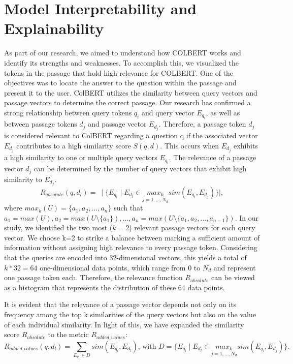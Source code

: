 \documentclass{article}
\begin{document}
\section{Model Interpretability and Explainability}
As part of our research, we aimed to understand how COLBERT works and identify its strengths and weaknesses.
To accomplish this, we visualized the tokens in the passage that hold high relevance for COLBERT. One of the objectives
was to locate the answer to the question within the passage and present it to the user.
ColBERT utilizes the similarity between query vectors and passage vectors to determine the correct passage.
Our research has confirmed a strong relationship between query tokens $q_i$ and query vector $E_{q_i}$, as well as between
passage tokens $d_j$ and passage vector $E_{d_j}$.
Therefore, a passage token $d_j$ is considered relevant to ColBERT regarding
a question q if the associated vector $E_{d_j}$ contributes to a high similarity score $S(q, d)$.
This occurs when $E_{d_j}$ exhibits a high similarity to one or multiple query vectors $E_{q_i}$.
The relevance of a passage vector $d_j$ can be determined by the number of query vectors that exhibit high similarity
to $E_{d_j}$.
$$
    R_{absolute}(q, d_l) = \:\mid \{E_{q_i} \mid E_{d_l} \in \underset{j = 1, \dots, N_d}{max_k} sim(E_{q_i}, E_{d_j})\} \mid,
$$
where $max_k(U) = \{a_1, a_2, \dots, a_n\}$ such that $a_1 = max(U), a_2 = max(U \setminus \{a_1\}), \dots, a_n = max(U \setminus \{a_1, a_2, \dots, a_{n-1}\})$.
In our study, we identified the two most ($k=2$) relevant passage vectors for each query vector.
We choose k=2 to strike a balance between marking a sufficient amount of information without assigning high relevance to every passage token. 
Considering that the queries are encoded into $32$-dimensional vectors, 
this yields a total of $k*32=64$ one-dimensional data points, which range from $0$ to $N_d$ and represent one passage token each.
Therefore, the relevance function $R_{absolute}$ can be viewed as a histogram that represents the distribution of these $64$ data points.

It is evident that the relevance of a passage vector depends not only on its frequency among the top k similarities of the query vectors
 but also on the value of each individual similarity.
In light of this, we have expanded the similarity score $R_{absolute}$ to the metric $R_{added\_values}$:
$$
	R_{added\_values}(q, d_l) = \sum_{E_{q_i} \in D} sim(E_{q_i}, E_{d_l}) \text{, with } D= \{E_{q_i} \mid E_{d_l} \in \underset{j = 1, \dots, N_d}{max_k} sim(E_{q_i}, E_{d_j})\}.
$$
\end{document}
